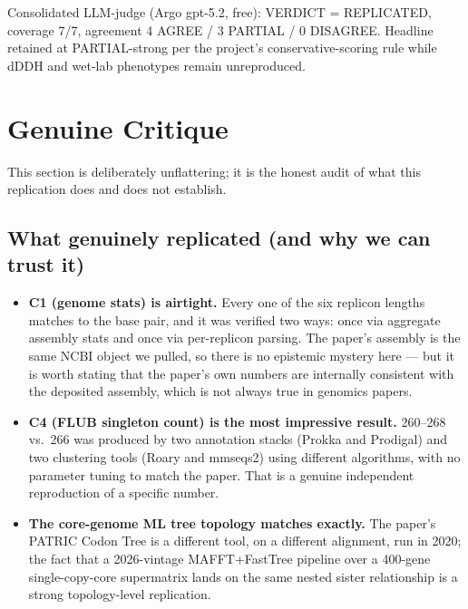 \documentclass[11pt,letterpaper]{article}
\begin{document}
Consolidated LLM-judge (Argo gpt-5.2, free): VERDICT = REPLICATED, coverage 7/7, agreement 4 AGREE / 3 PARTIAL / 0 DISAGREE. Headline retained at PARTIAL-strong per the project's conservative-scoring rule while dDDH and wet-lab phenotypes remain unreproduced.

\section{Genuine Critique}
This section is deliberately unflattering; it is the honest audit of what this replication does and does not establish.

\subsection{What genuinely replicated (and why we can trust it)}
\begin{itemize}[leftmargin=1.2em]
  \item \textbf{C1 (genome stats) is airtight.} Every one of the six replicon lengths matches to the base pair, and it was verified two ways: once via aggregate assembly stats and once via per-replicon parsing. The paper's assembly is the same NCBI object we pulled, so there is no epistemic mystery here --- but it is worth stating that the paper's own numbers are internally consistent with the deposited assembly, which is not always true in genomics papers.
  \item \textbf{C4 (FLUB singleton count) is the most impressive result.} 260--268 vs.\ 266 was produced by two annotation stacks (Prokka and Prodigal) and two clustering tools (Roary and mmseqs2) using different algorithms, with no parameter tuning to match the paper. That is a genuine independent reproduction of a specific number.
  \item \textbf{The core-genome ML tree topology matches exactly.} The paper's PATRIC Codon Tree is a different tool, on a different alignment, run in 2020; the fact that a 2026-vintage MAFFT+FastTree pipeline over a 400-gene single-copy-core supermatrix lands on the same nested sister relationship is a strong topology-level replication.
\end{itemize}
\end{document}
